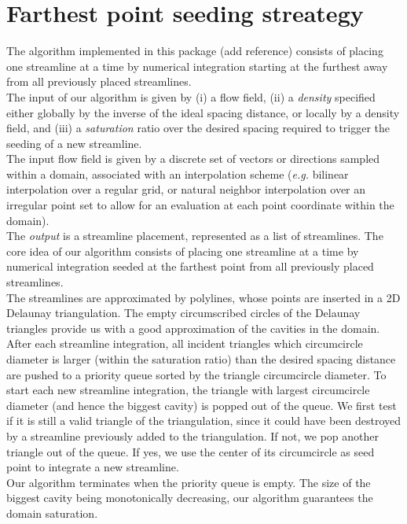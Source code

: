 \section{Farthest point seeding streategy}
\label{Section_2D_Streamlines_Strategy}
The algorithm implemented in this package (add reference) consists of placing
one streamline at a time by numerical integration starting at the furthest away
from all previously placed streamlines.\\The input of our algorithm is given by
(i) a flow field, (ii) a \textit{density} specified either globally by the
inverse of the ideal spacing distance, or locally by a density field, and (iii)
a \textit{saturation} ratio over the desired spacing required to trigger the
seeding of a new streamline.\\The input flow field is given by a discrete set of
vectors or directions sampled within a domain, associated with an interpolation
scheme (\textit{e.g.} bilinear interpolation over a regular grid, or natural
neighbor interpolation over an irregular point set to
allow for an evaluation at each point coordinate within the domain).\\The
\textit{output} is a streamline placement, represented as a list of streamlines.
The core idea of our algorithm consists of placing one streamline at a time by
numerical integration seeded at the farthest point from all previously placed
streamlines.\\The streamlines are approximated by polylines, whose points are
inserted in a 2D Delaunay triangulation. The empty circumscribed circles of the
Delaunay triangles provide us with a good approximation of the cavities in the
domain.\\After each streamline integration, all incident triangles which
circumcircle diameter is larger (within the saturation ratio) than the desired
spacing distance are pushed to a priority queue sorted by the triangle
circumcircle diameter. To start each new streamline integration, the triangle
with largest circumcircle diameter (and hence the biggest cavity) is popped out
of the queue. We first test if it is still a valid triangle of the
triangulation, since it could have been destroyed by a streamline previously
added to the triangulation. If not, we pop another triangle out of the queue. If
yes, we use the center of its circumcircle as seed point to integrate a new
streamline.\\Our algorithm terminates when the priority queue is empty. The size
of the biggest cavity being monotonically decreasing, our algorithm guarantees
the domain saturation.

